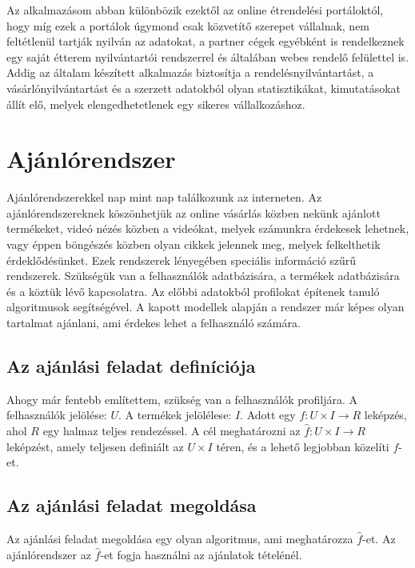Az alkalmazásom abban különbözik ezektől az online étrendelési portáloktól, hogy míg ezek a portálok úgymond csak közvetítő szerepet vállalnak, nem feltétlenül tartják nyilván az adatokat, a partner cégek egyébként is rendelkeznek egy saját étterem nyilvántartói rendszerrel és általában webes rendelő felülettel is. Addig az általam készített alkalmazás biztosítja a rendelésnyilvántartást, a vásárlónyilvántartást és a szerzett adatokból olyan statisztikákat, kimutatásokat állít elő, melyek elengedhetetlenek egy sikeres vállalkozáshoz.

\section{Ajánlórendszer}

Ajánlórendszerekkel nap mint nap találkozunk az interneten. Az ajánlórendszereknek köszönhetjük az online vásárlás közben nekünk ajánlott termékeket, videó nézés közben a videókat, melyek számunkra érdekesek lehetnek, vagy éppen böngészés közben olyan cikkek jelennek meg, melyek felkelthetik érdeklődésünket. Ezek rendszerek lényegében speciális információ szűrű rendszerek. Szükségük van a felhasználók adatbázisára, a termékek adatbázisára és a köztük lévő kapcsolatra. Az előbbi adatokból profilokat építenek tanuló algoritmusok segítségével. A kapott modellek alapján a rendszer már képes olyan tartalmat ajánlani, ami érdekes lehet a felhasználó számára.

\subsection{Az ajánlási feladat definíciója}

Ahogy már fentebb említettem, szükség van a felhasználók profiljára. A felhasználók jelölése: $U$. A termékek jelölélese: $I$. Adott egy $f: U \times I \rightarrow R$ leképzés, ahol $R$ egy halmaz teljes rendezéssel. A cél meghatározni az $\hat{f}: U \times I \rightarrow R$ leképzést, amely teljesen definiált az $U \times I$ téren, és a lehető legjobban közelíti $f$-et.

\subsection{Az ajánlási feladat megoldása}

Az ajánlási feladat megoldása egy olyan algoritmus, ami meghatározza $\hat{f}$-et. Az ajánlórendszer az $\hat{f}$-et fogja használni az ajánlatok tételénél.


